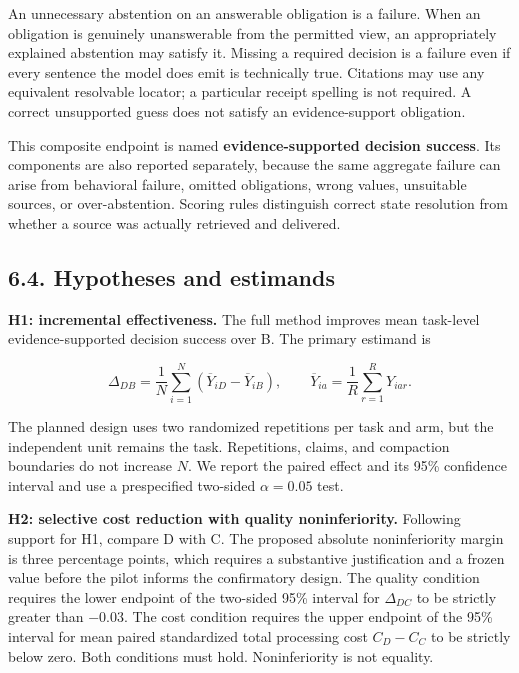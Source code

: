 \documentclass[
  11pt,
  a4paper,
]{article}
\begin{document}
An unnecessary abstention on an answerable obligation is a failure. When
an obligation is genuinely unanswerable from the permitted view, an
appropriately explained abstention may satisfy it. Missing a required
decision is a failure even if every sentence the model does emit is
technically true. Citations may use any equivalent resolvable locator; a
particular receipt spelling is not required. A correct unsupported guess
does not satisfy an evidence-support obligation.

This composite endpoint is named \textbf{evidence-supported decision
success}. Its components are also reported separately, because the same
aggregate failure can arise from behavioral failure, omitted
obligations, wrong values, unsuitable sources, or over-abstention.
Scoring rules distinguish correct state resolution from whether a source
was actually retrieved and delivered.

\subsection{6.4. Hypotheses and
estimands}\label{hypotheses-and-estimands}

\textbf{H1: incremental effectiveness.} The full method improves mean
task-level evidence-supported decision success over B. The primary
estimand is

\[
\Delta_{DB}=\frac{1}{N}\sum_{i=1}^{N}
\left(\overline{Y}_{iD}-\overline{Y}_{iB}\right),
\qquad
\overline{Y}_{ia}=\frac{1}{R}\sum_{r=1}^{R}Y_{iar}.
\]

The planned design uses two randomized repetitions per task and arm, but
the independent unit remains the task. Repetitions, claims, and
compaction boundaries do not increase \(N\). We report the paired effect
and its 95\% confidence interval and use a prespecified two-sided
\(\alpha=0.05\) test.

\textbf{H2: selective cost reduction with quality noninferiority.}
Following support for H1, compare D with C. The proposed absolute
noninferiority margin is three percentage points, which requires a
substantive justification and a frozen value before the pilot informs
the confirmatory design. The quality condition requires the lower
endpoint of the two-sided 95\% interval for \(\Delta_{DC}\) to be
strictly greater than \(-0.03\). The cost condition requires the upper
endpoint of the 95\% interval for mean paired standardized total
processing cost \(C_D-C_C\) to be strictly below zero. Both conditions
must hold. Noninferiority is not equality.
\end{document}
